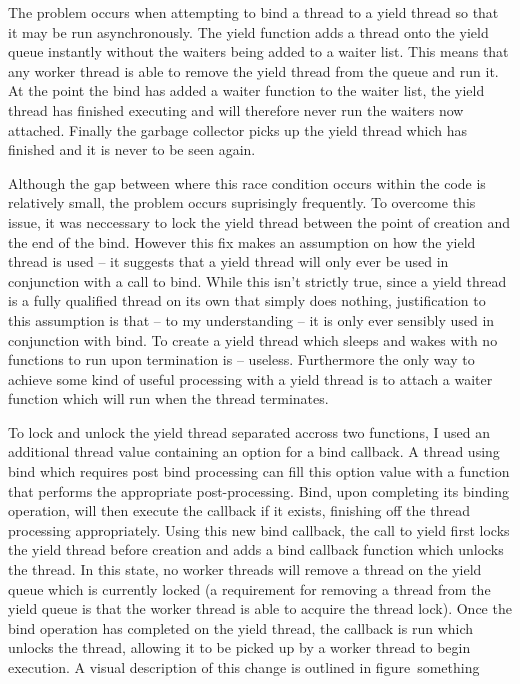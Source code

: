 \documentclass[12pt,twoside,notitlepage]{report}
\begin{document}
The problem occurs when attempting to bind a thread to a yield thread so that it may be run asynchronously. The yield function adds a thread onto the yield queue instantly without the waiters being added to a waiter list. This means
that any worker thread is able to remove the yield thread from the queue and run it. At the point the bind has added a waiter function to the waiter list, the yield thread has finished executing and will therefore never run the
waiters now attached. Finally the garbage collector picks up the yield thread which has finished and it is never to be seen again. 

%
%
Although the gap between where this race condition occurs within the code is relatively small, the problem occurs suprisingly frequently. To overcome this issue, it was neccessary to lock the yield thread between the point of creation
and the end of the bind. However this fix makes an assumption on how the yield thread is used -- it suggests that a yield thread will only ever be used in conjunction with a call to bind. While this isn't strictly true, since a yield
thread is a fully qualified thread on its own that simply does nothing, justification to this assumption is that -- to my understanding -- it is only ever sensibly used in conjunction with bind. To create a yield thread which sleeps
and wakes with no functions to run upon termination is -- useless. Furthermore the only way to achieve some kind of useful processing with a yield thread is to attach a waiter function which will run when the thread terminates.

To lock and unlock the yield thread separated accross two functions, I used an additional thread value containing an option for a bind callback. A thread using bind which requires post bind processing can fill this option value with
a function that performs the appropriate post-processing. Bind, upon completing its binding operation, will then execute the callback if it exists, finishing off the thread processing appropriately. Using this new bind callback, the
call to yield first locks the yield thread before creation and adds a bind callback function which unlocks the thread. In this state, no worker threads will remove a thread on the yield queue which is currently locked (a requirement
for removing a thread from the yield queue is that the worker thread is able to acquire the thread lock). Once the bind operation has completed on the yield thread, the callback is run which unlocks the thread, allowing it to be
picked up by a worker thread to begin execution. A visual description of this change is outlined in figure~something
\end{document}
